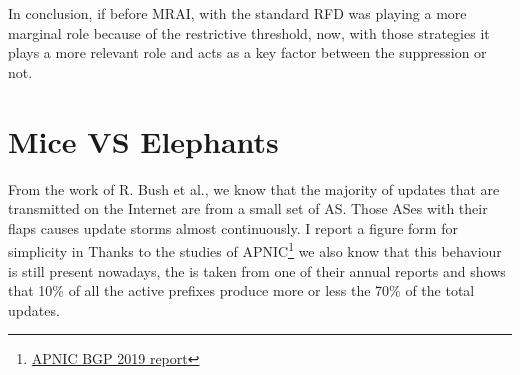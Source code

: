 In conclusion, if before \ac{MRAI}, with the standard \ac{RFD} was playing a more
marginal role because of the restrictive threshold, now, with those strategies
it plays a more relevant role and acts as a key factor between the suppression
or not.


\section{Mice VS Elephants}
\label{sec:bgp_rfd_mice_vs_elephants}

From the work of R. Bush et al., \cite{pelsser2011route} we know that the majority
of updates that are transmitted on the Internet are from a small set of \ac{AS}.
Those \ac{AS}es with their flaps causes update storms almost continuously.
I report a figure form \cite{pelsser2011route} for simplicity in
Thanks to the studies of
\ac{APNIC}\footnote{\href{https://blog.apnic.net/2020/01/15/bgp-in-2019-bgp-churn/}{APNIC BGP 2019 report}}
we also know that this behaviour is still present nowadays, the 
is taken from one of their annual reports and shows that \num{10}\% of
all the active prefixes produce more or less the \num{70}\% of the total
updates.


